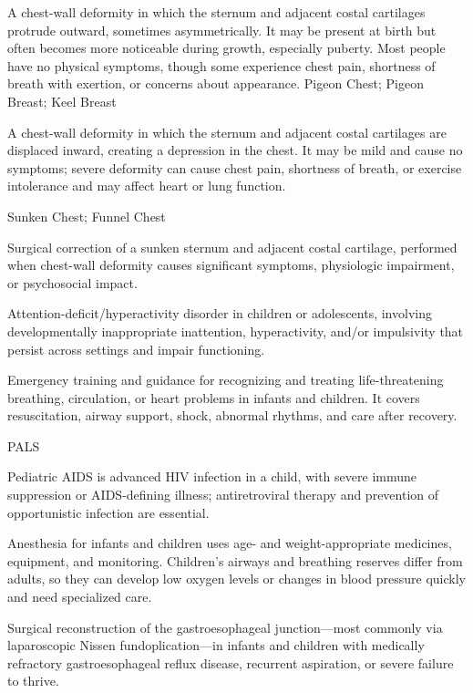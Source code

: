  A chest-wall deformity in which the sternum and adjacent costal cartilages protrude outward, sometimes asymmetrically. It may be present at birth but often becomes more noticeable during growth, especially puberty. Most people have no physical symptoms, though some experience chest pain, shortness of breath with exertion, or concerns about appearance.
\synonyms
Pigeon Chest; Pigeon Breast; Keel Breast

 A chest-wall deformity in which the sternum and adjacent costal cartilages are displaced inward, creating a depression in the chest. It may be mild and cause no symptoms; severe deformity can cause chest pain, shortness of breath, or exercise intolerance and may affect heart or lung function.

\synonyms
Sunken Chest; Funnel Chest

 Surgical correction of a sunken sternum and adjacent costal cartilage, performed when chest-wall deformity causes significant symptoms, physiologic impairment, or psychosocial impact.

 Attention-deficit/hyperactivity disorder in children or adolescents, involving developmentally inappropriate inattention, hyperactivity, and/or impulsivity that persist across settings and impair functioning.

 Emergency training and guidance for recognizing and treating life-threatening breathing, circulation, or heart problems in infants and children. It covers resuscitation, airway support, shock, abnormal rhythms, and care after recovery.

\synonyms
PALS

 Pediatric AIDS is advanced HIV infection in a child, with severe immune suppression or AIDS-defining illness; antiretroviral therapy and prevention of opportunistic infection are essential.

 Anesthesia for infants and children uses age- and weight-appropriate medicines, equipment, and monitoring. Children’s airways and breathing reserves differ from adults, so they can develop low oxygen levels or changes in blood pressure quickly and need specialized care.

 Surgical reconstruction of the gastroesophageal junction—most commonly via laparoscopic Nissen fundoplication—in infants and children with medically refractory gastroesophageal reflux disease, recurrent aspiration, or severe failure to thrive.

